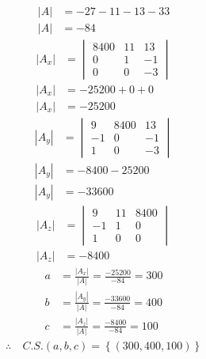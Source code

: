 \documentclass[10pt, a4paper]{article}
\begin{document}
\\
\begin{align*}
  \left|A\right| &= -27-11-13-33\\
  \left|A\right| &= -84
\end{align*}
\begin{align*}
  \left|A_x\right| &= \begin{vmatrix}
    8400 & 11 & 13\\
    0 & 1 & -1\\
    0 & 0 & -3
  \end{vmatrix}\\
  \left|A_x\right| &= -25200 + 0 + 0\\
  \left|A_x\right| &= -25200
\end{align*}
\begin{align*}
  \left|A_y\right| &= \begin{vmatrix}
    9 & 8400 & 13\\
    -1 & 0 & -1\\
    1 & 0 & -3
  \end{vmatrix}\\
  \left|A_y\right| &= -8400-25200\\
  \left|A_y\right| &= -33600
\end{align*}
\begin{align*}
  \left|A_z\right| &= \begin{vmatrix}
    9 & 11 & 8400\\
    -1 & 1 & 0\\
    1 & 0 & 0
  \end{vmatrix}\\
  \left|A_z\right| &= -8400
\end{align*}
\begin{align*}
  a &= \frac{\left|A_x\right|}{\left|A\right|} = \frac{-25200}{-84} = 300\\
  b &= \frac{\left|A_y\right|}{\left|A\right|} = \frac{-33600}{-84} = 400\\
  c &= \frac{\left|A_z\right|}{\left|A\right|} = \frac{-8400}{-84} = 100
\end{align*}
\begin{align*}
  \therefore \ &C.S. \left(a,b,c\right) = \left\{\left(300,400,100\right)\right\}
\end{align*}
\begin{center}
\end{center}
\newpage
\end{document}
